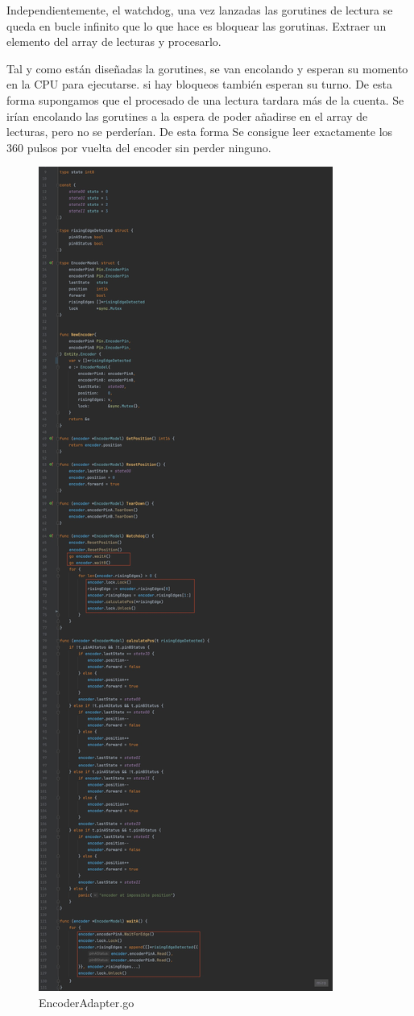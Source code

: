 Independientemente, el watchdog, una vez lanzadas las gorutines de lectura se queda en bucle infinito que lo que hace es bloquear las gorutinas. Extraer un elemento del array de lecturas y procesarlo.

Tal y como están diseñadas la gorutines, se van encolando y esperan su momento en la CPU para ejecutarse. si hay bloqueos también esperan su turno. De esta forma supongamos que el procesado de una lectura tardara más de la cuenta. Se irían encolando las gorutines a la espera de poder añadirse en el array de lecturas, pero no se perderían. De esta forma Se consigue leer exactamente los 360 pulsos por vuelta del encoder sin perder ninguno.

\begin{figure}[H]
    \centering
    \includegraphics[height=0.95\textheight]{./part/Ejecucion/Seguimiento/Encoder/img/PFM - Encoder}
    \caption{EncoderAdapter.go}\label{fig:EncoderAdapter}
\end{figure}